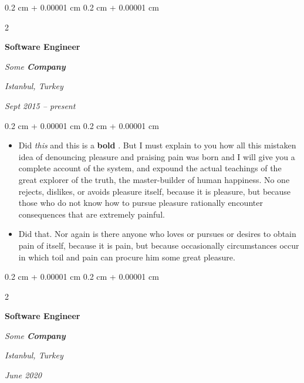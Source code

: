 \documentclass[10pt, letterpaper]{article}
\newenvironment{highlights}{
    \begin{itemize}[
        topsep=0.10 cm,
        parsep=0.10 cm,
        partopsep=0pt,
        itemsep=0pt,
        leftmargin=0.4 cm + 10pt
    ]
}{
    \end{itemize}
} %
\newenvironment{onecolentry}{
    \begin{adjustwidth}{
        0.2 cm + 0.00001 cm
    }{
        0.2 cm + 0.00001 cm
    }
}{
    \end{adjustwidth}
} %
\newenvironment{twocolentry}[2][]{
    \onecolentry
    \def\secondColumn{#2}
    \setcolumnwidth{\fill, 4.5 cm}
    \begin{paracol}{2}
}{
    \switchcolumn \raggedleft \secondColumn
    \end{paracol}
    \endonecolentry
} %
\let\hrefWithoutArrow\href
\renewcommand{\href}[2]{\hrefWithoutArrow{#1}{\ifthenelse{\equal{#2}{}}{ }{#2 }\raisebox{.15ex}{\footnotesize \faExternalLink*}}}
\begin{document}
        \vspace{0.2 cm}

            \begin{twocolentry}{
        \textit{Istanbul, Turkey}

        \textit{Sept 2015 – present}    }
                \textbf{Software Engineer}

                \textit{Some \textbf{Company}}
            \end{twocolentry}

        \vspace{0.10 cm}
        \begin{onecolentry}
            \begin{highlights}
                \item Did \textit{this} and this is a \textbf{bold} \href{https://example.com}{link}. But I must explain to you how all this mistaken idea of denouncing pleasure and praising pain was born and I will give you a complete account of the system, and expound the actual teachings of the great explorer of the truth, the master-builder of human happiness. No one rejects, dislikes, or avoids pleasure itself, because it is pleasure, but because those who do not know how to pursue pleasure rationally encounter consequences that are extremely painful.
                \item Did that. Nor again is there anyone who loves or pursues or desires to obtain pain of itself, because it is pain, but because occasionally circumstances occur in which toil and pain can procure him some great pleasure.
            \end{highlights}
        \end{onecolentry}


        \vspace{0.2 cm}

            \begin{twocolentry}{
        \textit{Istanbul, Turkey}

        \textit{June 2020}    }
                \textbf{Software Engineer}

                \textit{Some \textbf{Company}}
            \end{twocolentry}
\end{document}
